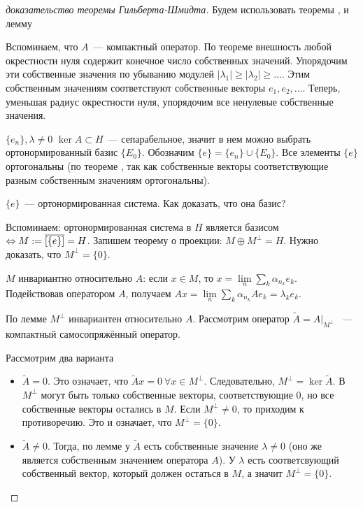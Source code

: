 \begin{proof}[доказательство теоремы Гильберта-Шмидта]
    Будем использовать теоремы ,  и лемму 

    
    Вспоминаем, что $A$~--- компактный оператор. По теореме  внешность любой окрестности нуля содержит конечное число собственных значений.
    Упорядочим эти собственные значения по убыванию модулей $|\lambda_1| \geqslant |\lambda_2| \geq \ldots$. Этим собственным значениям соответствуют собственные векторы $e_1, e_2, \ldots$. Теперь, уменьшая радиус окрестности нуля, упорядочим все ненулевые собственные значения.

    $\{ e_n \}, \lambda \neq 0$
    $\ker A \subset H$~--- сепарабельное, значит в нем можно выбрать ортонормированный базис $\{ E_0 \}$. Обозначим $\{e\} = \{e_n\} \cup \{E_0\}$. Все элементы $\{e\}$ ортогональны (по теореме , так как собственные векторы соответствующие разным собственным значениям ортогональны).

    $\{e\}$~--- ортонормированная система. Как доказать, что она базис?

    Вспоминаем: ортонормированная система в $H$ является базисом $\Leftrightarrow M:=\overline{[\{e\}]}=H$.
    Запишем теорему о проекции: $M \oplus M^\perp = H$. Нужно доказать, что $M^\perp = \{0\}$.

    $M$ инвариантно относительно $A$: если $x \in M$, то $x = \lim \limits_{n} \sum \limits_k \alpha_{n_k} e_k$. Подействовав оператором $A$, получаем $Ax = \lim \limits_{n} \sum \limits_k \alpha_{n_k} A e_k = \lambda_k e_k$.

    По лемме  $M^\perp$ инвариантен относительно $A$.
    Рассмотрим оператор $\tilde{A} = \left. A \right|_{M^\perp}$
    ~--- компактный самосопряжённый оператор.

    Рассмотрим два варианта
    \begin{itemize}
        \item $\tilde{A} = 0$.
        Это означает, что $\tilde{A} x = 0 \: \forall x \in M^\perp$. Следовательно, 
        $M^\perp = \ker \tilde{A}$. В $M^\perp$ могут быть только собственные векторы, соответствующие 0, но все собственные векторы остались в $M$. Если $M^\perp \neq 0$, то приходим к противоречию. Это и означает, что $M^\perp = \{0\}$.
        \item $\tilde{A} \neq 0$.
        Тогда, по лемме  у $\tilde{A}$ есть собственные значение $\lambda \neq 0$ (оно же является собственным значением оператора $A$).
        У $\lambda$ есть соответсвующий собственный вектор, который должен остаться в $M$, а значит $M^\perp = \{0\}$. %
    \end{itemize}
\end{proof}

